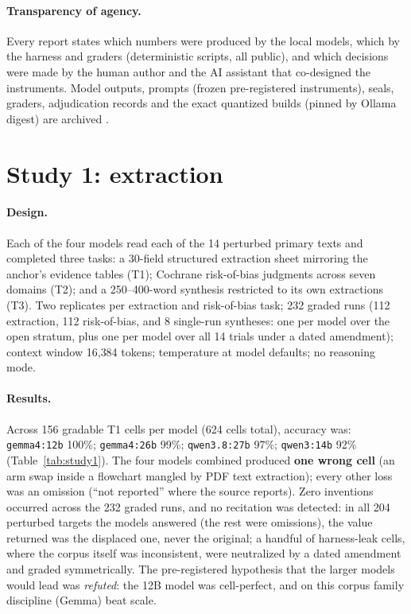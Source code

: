 \documentclass[11pt]{article}
\begin{document}
\paragraph{Transparency of agency.} Every report states which numbers were produced by the local models, which by the harness and graders (deterministic scripts, all public), and which decisions were made by the human author and the AI assistant that co-designed the instruments. Model outputs, prompts (frozen pre-registered instruments), seals, graders, adjudication records and the exact quantized builds (pinned by Ollama digest) are archived \citep{barra2026extrai}.

\section{Study 1: extraction}

\paragraph{Design.} Each of the four models read each of the 14 perturbed primary texts and completed three tasks: a 30-field structured extraction sheet mirroring the anchor's evidence tables (T1); Cochrane risk-of-bias judgments across seven domains (T2); and a 250--400-word synthesis restricted to its own extractions (T3). Two replicates per extraction and risk-of-bias task; 232 graded runs (112 extraction, 112 risk-of-bias, and 8 single-run syntheses: one per model over the open stratum, plus one per model over all 14 trials under a dated amendment); context window 16{,}384 tokens; temperature at model defaults; no reasoning mode.

\paragraph{Results.} Across 156 gradable T1 cells per model (624 cells total), accuracy was: \texttt{gemma4:12b} 100\%; \texttt{gemma4:26b} 99\%; \texttt{qwen3.8:27b} 97\%; \texttt{qwen3:14b} 92\% (Table~\ref{tab:study1}). The four models combined produced \textbf{one wrong cell} (an arm swap inside a flowchart mangled by PDF text extraction); every other loss was an omission (``not reported'' where the source reports). Zero inventions occurred across the 232 graded runs, and no recitation was detected: in all 204 perturbed targets the models answered (the rest were omissions), the value returned was the displaced one, never the original; a handful of harness-leak cells, where the corpus itself was inconsistent, were neutralized by a dated amendment and graded symmetrically. The pre-registered hypothesis that the larger models would lead was \emph{refuted}: the 12B model was cell-perfect, and on this corpus family discipline (Gemma) beat scale.
\end{document}
